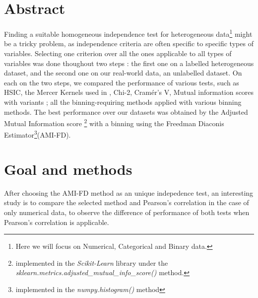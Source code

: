 \documentclass[
10pt, %
a4paper, %
oneside, %
headinclude,footinclude, %
BCOR5mm, %
]{scrartcl}
\begin{document}



\section{Abstract}
Finding a suitable homogeneous independence test for heterogeneous data\footnote{Here we will focus on Numerical, Categorical and Binary data.} might be a tricky problem, as independence criteria are often specific to specific types of variables. Selecting one criterion over all the ones applicable to all types of variables was done thoughout two steps : the first one on a labelled heterogeneous dataset, and the second one on our real-world data, an unlabelled dataset. On each on the two steps, we compared the performance of various tests, such as HSIC, the Mercer Kernels used in \cite{bach2002learning}, Chi-2, Cramér's V, Mutual information scores with variants ; all the binning-requiring methods applied with various binning methods. The best performance over our datasets was obtained by the Adjusted Mutual Information score \cite{vinh2010information}\footnote{implemented in the \textit{Scikit-Learn} \cite{scikit-learn} library under the \textit{sklearn.metrics.adjusted\_mutual\_info\_score()} method.} with a binning using the Freedman Diaconis Estimator\footnote{implemented in the \textit{numpy.histogram()} method}(AMI-FD). 
 
\section{Goal and methods}
After choosing the AMI-FD method as an unique indepedence test, an interesting study is to compare the selected method and Pearson's correlation in the case of only numerical data, to observe the difference of performance of both tests when Pearson's correlation is applicable.





\renewcommand{\refname}{\spacedlowsmallcaps{References}} %




\end{document}
